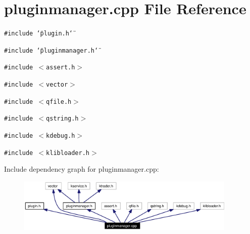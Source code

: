 \section{pluginmanager.cpp File Reference}
\label{pluginmanager_8cpp}


{\tt \#include \char`\"{}plugin.h\char`\"{}}\par
{\tt \#include \char`\"{}pluginmanager.h\char`\"{}}\par
{\tt \#include $<$assert.h$>$}\par
{\tt \#include $<$vector$>$}\par
{\tt \#include $<$qfile.h$>$}\par
{\tt \#include $<$qstring.h$>$}\par
{\tt \#include $<$kdebug.h$>$}\par
{\tt \#include $<$klibloader.h$>$}\par


Include dependency graph for pluginmanager.cpp:\begin{figure}[H]
\begin{center}
\leavevmode
\includegraphics[width=297pt]{pluginmanager_8cpp__incl}
\end{center}
\end{figure}
